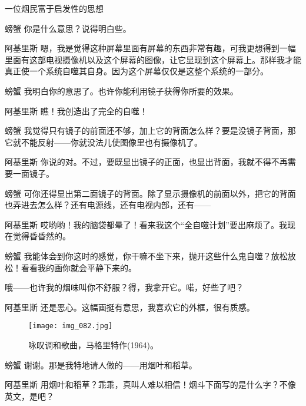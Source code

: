 \begin{dialog}{一位烟民富于启发性的思想}
\begin{dialogue}
\item[螃蟹]你是什么意思？说得明白些。

\item[阿基里斯]嗯，我是觉得这种屏幕里面有屏幕的东西非常有趣，可我更想得到一幅里面有这部电视摄像机以及这个屏幕的图像，让它显现到这个屏幕上。那样我才能真正使一个系统自噬其自身。因为这个屏幕仅仅是这整个系统的一部分。

\item[螃蟹]我明白你的意思了。也许你能利用镜子获得你所要的效果。


\item[阿基里斯]瞧！我创造出了完全的自噬！

\item[螃蟹]我觉得只有镜子的前面还不够，加上它的背面怎么样？要是没镜子背面，那它就不能反射——你就没法儿使图像里也有摄像机了。

\item[阿基里斯]你说的对。不过，要既显出镜子的正面，也显出背面，我就不得不再需要一面镜子。

\item[螃蟹]可你还得显出第二面镜子的背面。除了显示摄像机的前面以外，把它的背面也弄进去怎么样？还有电源线，还有电视内部，还有——

\item[阿基里斯]哎哟哟！我的脑袋都晕了！看来我这个“全自噬计划”要出麻烦了。我现在觉得昏昏然的。

\item[螃蟹]我能体会到你这时的感觉，你干嘛不坐下来，抛开这些什么鬼自噬？放松放松！看看我的画你就会平静下来的。


哦——也许我的烟味叫你不舒服？得，我拿开它。喏，好些了吧？

\item[阿基里斯]还是恶心。这幅画挺有意思，我喜欢它的外框，很有质感。

\begin{figure}
\texttt{[image: img\_082.jpg]}
\caption[咏叹调和歌曲，马格里特作。]
  {咏叹调和歌曲，马格里特作(1964)。}
\end{figure}

\item[螃蟹]谢谢。那是我特地请人做的——用烟叶和稻草。

\item[阿基里斯]用烟叶和稻草？乖乖，真叫人难以相信！烟斗下面写的是什么字？不像英文，是吧？


\end{dialogue}
\end{dialog}
